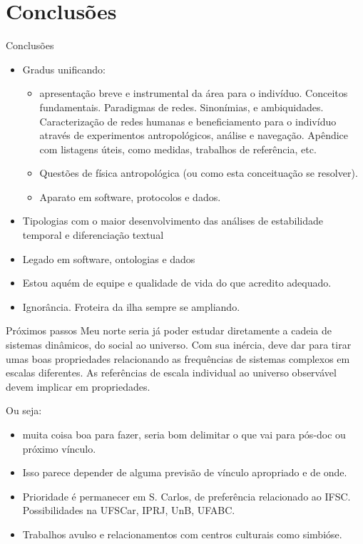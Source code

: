 \documentclass[10pt]{beamer}
\begin{document}
\section{Conclusões}
\begin{frame}{Conclusões}
\begin{itemize}
	\item Gradus unificando:
		\begin{itemize}
			\item  apresentação breve e instrumental da área para o indivíduo. Conceitos fundamentais. Paradigmas de redes. Sinonímias, e ambiquidades. Caracterização de redes humanas e beneficiamento para o indivíduo através de experimentos antropológicos, análise e navegação.
				Apêndice com listagens úteis, como medidas, trabalhos de referência, etc.
			\item Questões de física antropológica (ou como esta conceituação se resolver).
			\item Aparato em software, protocolos e dados.
		\end{itemize}
	\item Tipologias com o maior desenvolvimento das análises de estabilidade temporal e diferenciação textual
	\item Legado em software, ontologias e dados
	\item Estou aquém de equipe e qualidade de vida do que acredito adequado. 
	\item Ignorância. Froteira da ilha sempre se ampliando.
\end{itemize}
\end{frame}

\begin{frame}{Próximos passos}
Meu norte seria já poder estudar diretamente a cadeia de sistemas dinâmicos, do social ao universo. Com sua inércia, deve dar para tirar umas boas propriedades relacionando as frequências de sistemas complexos em escalas diferentes. As referências de escala individual ao universo observável devem implicar em propriedades.

Ou seja:
	\begin{itemize}
		\item muita coisa boa para fazer, seria bom delimitar o que vai para pós-doc ou próximo vínculo.
		\item Isso parece depender de alguma previsão de vínculo apropriado e de onde.
		\item Prioridade é permanecer em S. Carlos, de preferência relacionado ao IFSC. Possibilidades na UFSCar, IPRJ, UnB, UFABC.
		\item Trabalhos avulso e relacionamentos com centros culturais como simbióse.
	\end{itemize}
\end{frame}
\end{document}
